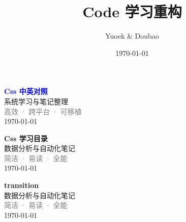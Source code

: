 \documentclass[UTF8, a4paper, 12pt]{ctexart}
\title{\Large Code 学习重构}
\author{Yuoek \& Doubao}
\date{\today}
\begin{document}
\maketitle
\tableofcontents
\clearpage

\thispagestyle{empty}
\vspace*{\fill}
\begin{center}
    \textcolor{blue}{\Huge\textbf{Css 中英对照}} \\[1em]
    \textcolor{blue!60!black}{\Large 系统学习与笔记整理} \\[2em]
    \textcolor{gray}{\large 高效 · 跨平台 · 可移植} \\[1em]
    \today
\end{center}
\vspace*{\fill}
\clearpage


\clearpage
\thispagestyle{empty}
\vspace*{\fill}
\begin{center}
    \textcolor{green!70!black}{\Huge\textbf{Css 学习目录}} \\[1em]
    \textcolor{green!40!black}{\Large 数据分析与自动化笔记} \\[2em]
    \textcolor{gray}{\large 简洁 · 易读 · 全能} \\[1em]
    \today
\end{center}
\vspace*{\fill}
\clearpage


\clearpage

\thispagestyle{empty}
\vspace*{\fill}
\begin{center}
    \textcolor{green!70!black}{\Huge\textbf{transition}} \\[1em]
    \textcolor{green!40!black}{\Large 数据分析与自动化笔记} \\[2em]
    \textcolor{gray}{\large 简洁 · 易读 · 全能} \\[1em]
    \today
\end{center}
\vspace*{\fill}
\clearpage


\clearpage
\end{document}
